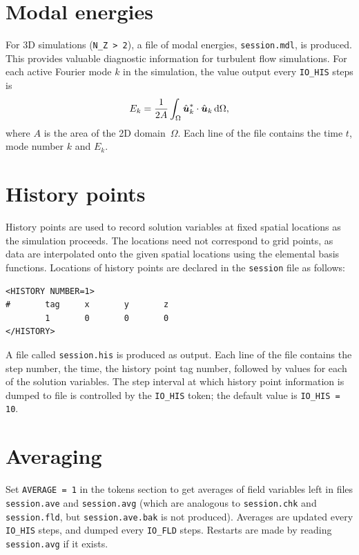 \documentclass[11pt,a4paper]{report}
\def\bs#1{\mbox{\boldmath$#1$}}                     %
\begin{document}
\section{Modal energies}

For 3D simulations (\verb+N_Z > 2+), a file of modal energies,
\verb+session.mdl+, is produced.  This provides valuable diagnostic
information for turbulent flow simulations.  For each active Fourier
mode $k$ in the simulation, the value output every \verb+IO_HIS+ steps
is 
\[
E_k =
\frac{1}{2A}\int_\Omega
\hat{\bs{u}}_k^\ast\cdot\hat{\bs{u}}_k \,{\rm d}\Omega,
\]
where $A$ is the area of the 2D domain~$\Omega$.  Each line of the
file contains the time $t$, mode number $k$ and $E_k$.

\section{History points}

History points are used to record solution variables at fixed spatial
locations as the simulation proceeds.  The locations need not
correspond to grid points, as data are interpolated onto the given
spatial locations using the elemental basis functions.  Locations of
history points are declared in the \verb+session+ file as follows:
\begin{verbatim}
<HISTORY NUMBER=1>
#       tag     x       y       z 
        1       0       0       0
</HISTORY>
\end{verbatim}

A file called \verb+session.his+ is produced as output.  Each line of
the file contains the step number, the time, the history point tag
number, followed by values for each of the solution variables.  The
step interval at which history point information is dumped to file is
controlled by the \verb+IO_HIS+ token; the default value is
\verb+IO_HIS = 10+.

\section{Averaging}

Set \verb+AVERAGE = 1+ in the tokens section to get averages of field
variables left in files \verb+session.ave+ and \verb+session.avg+
(which are analogous to \verb+session.chk+ and \verb+session.fld+, but
\verb+session.ave.bak+ is not produced).  Averages are updated
every \verb+IO_HIS+ steps, and dumped every \verb+IO_FLD+ steps.
Restarts are made by reading \verb+session.avg+ if it exists.
\end{document}
